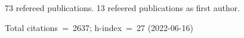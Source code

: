73 refereed publications. 13 refeered publications as first author.

Total citations~=~2637; h-index~=~27 (2022-06-16)